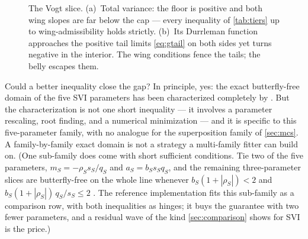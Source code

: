 \begin{figure}[htbp]
\centering
{}
\caption{The Vogt slice.  (a)~Total variance: the floor is positive and
both wing slopes are far below the cap --- every inequality of
\cref{tab:tiers} up to wing-admissibility holds strictly.  (b)~Its
Durrleman function approaches the positive tail limits \eqref{eq:gtail}
on both sides yet turns negative in the interior.  The wing conditions
fence the tails; the belly escapes them.}
\label{fig:svivogt}
\end{figure}

Could a better inequality close the gap?  In principle, yes: the exact
butterfly-free domain of the five SVI parameters has been characterized
completely by \citet{MartiniMingone2022}.  But the characterization is
not one short inequality --- it involves a parameter rescaling, root
finding, and a numerical minimization --- and it is specific to this
five-parameter family, with no analogue for the superposition family of
\cref{sec:mcs}.  A family-by-family exact domain is not a strategy a
multi-family fitter can build on.  (One sub-family does come with
short sufficient conditions.  Tie two of the five parameters,
$m_S=-\rho_Ss_S/q_S$ and $a_S=b_Ss_Sq_S$, and the remaining
three-parameter slices are butterfly-free on the whole line whenever
$b_S(1+|\rho_S|)<2$ and $b_S(1+|\rho_S|)\,q_S/s_S\le2$
\citep{GatheralJacquier2014}.  The reference implementation fits this
sub-family as a comparison row, with both inequalities as hinges; it
buys the guarantee with two fewer parameters, and a residual wave of
the kind \cref{sec:comparison} shows for SVI is the price.)

